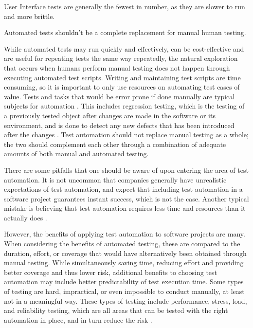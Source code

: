 \cite{PLURALSIGHT lecture: Automated Testing: End To End}


User Interface tests are generally the fewest in number, as they are slower to run and more brittle.

Automated tests shouldn't be a complete replacement for manual human testing.

 While automated tests may run quickly and effectively, can be cost-effective and are useful for repeating tests the same way repeatedly, the natural exploration that occurs when humans perform manual testing does not happen through executing automated test scripts. Writing and maintaining test scripts are time consuming, so it is important to only use resources on automating test cases of value. Tests and tasks that would be error prone if done manually are typical subjects for automation \cite{ASTvol3}. This includes regression testing, which is the testing of a previously tested object after changes are made in the software or its environment, and is done to detect any new defects that has been introduced after the changes \cite{SoftwareTestingFoundations}. Test automation should not replace manual testing as a whole; the two should complement each other through a combination of adequate amounts of both manual and automated testing.

There are some pitfalls that one should be aware of upon entering the area of test automation. It is not uncommon that companies generally have unrealistic expectations of test automation, and expect that including test automation in a software project guarantees instant success, which is not the case. Another typical mistake is believing that test automation requires less time and resources than it actually does \cite{ASTvol3}.

However, the benefits of applying test automation to software projects are many. When considering the benefits of automated testing, these are compared to the duration, effort, or coverage that would have alternatively been obtained through manual testing. While simultaneously saving time, reducing effort and providing better coverage and thus lower risk, additional benefits to choosing test automation may include better predictability of test execution time. Some types of testing are hard, impractical, or even impossible to conduct manually, at least not in a meaningful way. These types of testing include performance, stress, load, and reliability testing, which are all areas that can be tested with the right automation in place, and in turn reduce the risk \cite{ASTvol3}.

